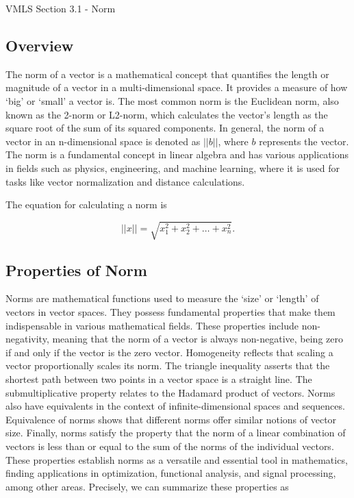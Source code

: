 \begin{notes}{VMLS Section 3.1 - Norm}
    \subsection*{Overview}

    The norm of a vector is a mathematical concept that quantifies the length or magnitude of a vector in a multi-dimensional space. It provides a measure of how `big' or `small' a vector is. The most 
    common norm is the Euclidean norm, also known as the 2-norm or L2-norm, which calculates the vector's length as the square root of the sum of its squared components. In general, the norm of a vector 
    in an n-dimensional space is denoted as $||b||$, where $b$ represents the vector. The norm is a fundamental concept in linear algebra and has various applications in fields such as physics, 
    engineering, and machine learning, where it is used for tasks like vector normalization and distance calculations.

    \begin{highlight}
        The equation for calculating a norm is

        \begin{equation*}
            ||x|| = \sqrt{x^{2}_{1} + x^{2}_{2} + \dots + x^{2}_{n}}.
        \end{equation*}
    \end{highlight}

    \subsection*{Properties of Norm}

    Norms are mathematical functions used to measure the `size' or `length' of vectors in vector spaces. They possess fundamental properties that make them indispensable in various mathematical fields. 
    These properties include non-negativity, meaning that the norm of a vector is always non-negative, being zero if and only if the vector is the zero vector. Homogeneity reflects that scaling a vector 
    proportionally scales its norm. The triangle inequality asserts that the shortest path between two points in a vector space is a straight line. The submultiplicative property relates to the Hadamard 
    product of vectors. Norms also have equivalents in the context of infinite-dimensional spaces and sequences. Equivalence of norms shows that different norms offer similar notions of vector size. Finally, 
    norms satisfy the property that the norm of a linear combination of vectors is less than or equal to the sum of the norms of the individual vectors. These properties establish norms as a versatile and 
    essential tool in mathematics, finding applications in optimization, functional analysis, and signal processing, among other areas. Precisely, we can summarize these properties as


\end{notes}
